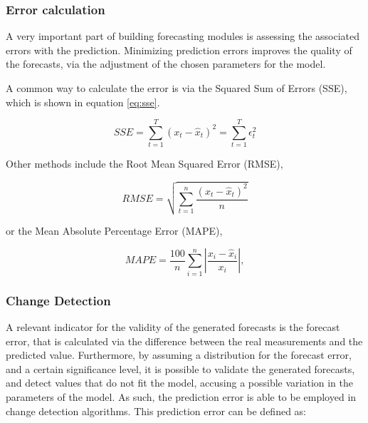 \subsubsection{Error calculation}

A very important part of building forecasting modules is assessing the associated errors with the prediction. Minimizing prediction errors improves the quality of the
forecasts, via the adjustment of the chosen parameters for the model.

\par A common way to calculate the error is via the Squared Sum of Errors (SSE), which is shown in equation \ref{eq:sse}. 

\begin {equation*} 
    \label{eq:sse}
    SSE = \sum_{t=1}^T{(x_t-\hat{x}_{t})^2} = \sum_{t=1}^T{\epsilon_t^2}
\end {equation*}

\par Other methods include the Root Mean Squared Error (RMSE),

\begin {equation*} 
    \label{eq:mape}
     RMSE = \sqrt{\sum_{t=1}^n\frac{(x_t-\hat{x}_{t})^2}{n}} 
\end {equation*}

\par or the Mean Absolute Percentage Error (MAPE),

\begin {equation*} 
    \label{eq:mape}
    MAPE = \frac{100}{n} \sum_{i=1}^n{\left | \frac{x_i - \hat{x}_i}{x_i} \right |},
\end {equation*}

\subsubsection {Change Detection} \label{sec:change_detection}

A relevant indicator for the validity of the generated forecasts is the forecast error, that is calculated via the difference between the real measurements and the
predicted value. Furthermore, by assuming a distribution for the forecast error, and a certain significance level, it is possible to validate the generated forecasts,
and detect values that do not fit the model, accusing a possible variation in the parameters of the model. As such, the prediction error is able to be employed in 
change detection algorithms. This prediction error can be defined as:

